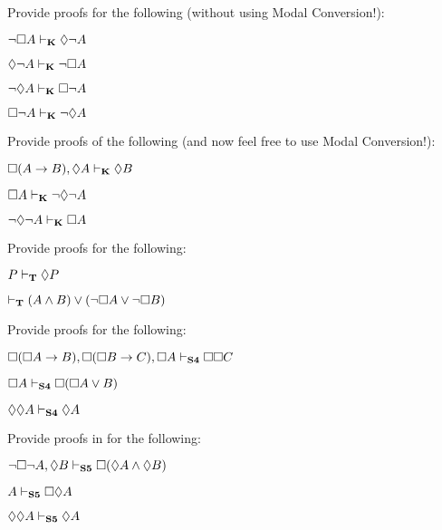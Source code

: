 \problempart
Provide proofs for the following (without using Modal Conversion!):
\begin{compactlist}
	\item $\neg\Box A\vdash_{\mathbf{K}} \Diamond \neg A$
	\item $\Diamond\neg A\vdash_{\mathbf{K}}\neg \Box A$
	\item $\neg\Diamond A\vdash_{\mathbf{K}}\Box\neg A$
	\item $\Box\neg A\vdash_{\mathbf{K}}\neg\Diamond A$
\end{compactlist}

\problempart
Provide proofs of the following (and now feel free to use Modal Conversion!):
\begin{compactlist}
	\item $\Box(A\rightarrow B), \Diamond A \vdash_{\mathbf{K}} \Diamond B$
	\item $\Box A \vdash_{\mathbf{K}} \neg\Diamond\neg A$
	\item $\neg\Diamond\neg A \vdash_{\mathbf{K}} \Box A$
\end{compactlist}

\problempart
Provide proofs for the following:
\begin{compactlist}
	\item $P\vdash_{\mathbf{T}}\Diamond P$
	\item $\vdash_{\mathbf{T}} (A\wedge B)\vee(\neg \Box A\vee\neg\Box B)$
\end{compactlist}

\problempart
Provide proofs for the following:
\begin{compactlist}
	\item $\Box(\Box A\rightarrow B), \Box (\Box B\rightarrow C), \Box A \vdash_{\mathbf{S4}} \Box\Box C$
	\item $\Box A \vdash_{\mathbf{S4}} \Box(\Box A \vee B)$
	\item $\Diamond \Diamond A \vdash_{\mathbf{S4}} \Diamond A$
\end{compactlist}


\problempart
Provide proofs in \mlSfive{} for the following:
\begin{compactlist}
	\item $\neg\Box\neg A, \Diamond B\vdash_{\mathbf{S5}} \Box(\Diamond A \wedge \Diamond B)$
	\item $A \vdash_{\mathbf{S5}}  \Box\Diamond A$
	\item $\Diamond\Diamond A\vdash_{\mathbf{S5}}  \Diamond A$
\end{compactlist}


